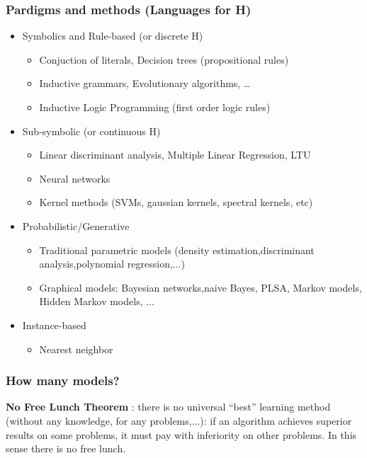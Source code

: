 \documentclass[../main.tex]{subfiles}
\begin{document}
\subsubsection{Pardigms and methods (Languages for H)}
\begin{itemize}
    \item Symbolics and Rule-based (or discrete H)
    \begin{itemize}
        \item Conjuction of literals, Decision trees (propositional rules)
        \item Inductive grammars, Evolutionary algorithms, …
        \item Inductive Logic Programming (first order logic rules)
    \end{itemize}
    \item Sub-symbolic (or continuous H)
    \begin{itemize}
        \item Linear discriminant analysis, Multiple Linear Regression, LTU
        \item Neural networks
        \item Kernel methods (SVMs, gaussian kernels, spectral kernels, etc)
    \end{itemize}
    \item Probabilistic/Generative
    \begin{itemize}
        \item Traditional parametric models (density estimation,discriminant analysis,polynomial regression,...)
        \item Graphical models: Bayesian networks,naive Bayes, PLSA, Markov models, Hidden Markov models, ...
    \end{itemize}
    \item Instance-based
    \begin{itemize}
        \item Nearest neighbor
    \end{itemize}
\end{itemize}

\subsubsection{How many models?}
\textbf{No Free Lunch Theorem} : there is no universal “best” learning method (without any knowledge, for any problems,...): if an algorithm achieves superior results on some problems, it must pay with inferiority on other problems. In this sense there is no free lunch.\\
\end{document}
